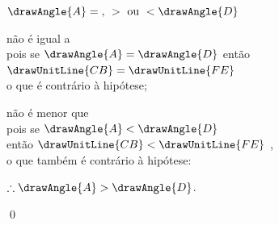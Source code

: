 \documentclass[booklanguage=brazilian]{byrnebook}
\begin{document}
\begin{center}
$\drawAngle{A} =\mbox{, } > \mbox{ ou } < \drawAngle{D}$

 não é igual a \\
pois se $\drawAngle{A} = \drawAngle{D}$ então $\drawUnitLine{CB} = \drawUnitLine{FE}$ \\
o que é contrário à hipótese;

 não é menor que \\
pois se $\drawAngle{A} < \drawAngle{D}$\\
então $\drawUnitLine{CB} < \drawUnitLine{FE}$ ,\\
o que também é contrário à hipótese:

$\therefore \drawAngle{A} > \drawAngle{D}$.
\end{center}

\qed
\end{document}
